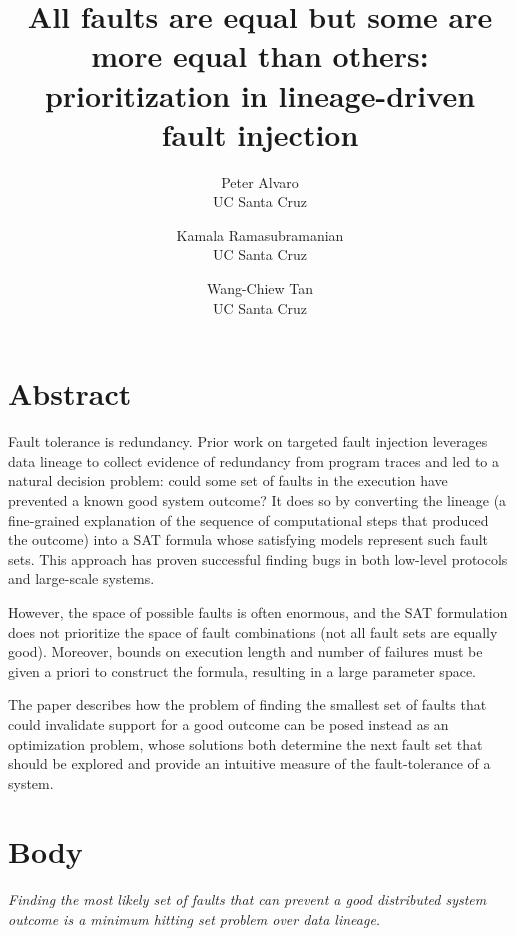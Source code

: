 \documentclass[10pt]{article}
\title{All faults are equal but some are more equal than others: prioritization in lineage-driven fault injection}
\author{Peter Alvaro\\
UC Santa Cruz\\
\and
Kamala Ramasubramanian\\
UC Santa Cruz\\
\and
Wang-Chiew Tan\\
UC Santa Cruz\\
}
\date{}
\begin{document}
\maketitle

\section{Abstract}

Fault tolerance is redundancy.  Prior work on targeted fault injection leverages data lineage to collect evidence of redundancy from program traces and led to a natural decision problem: could some set of faults in the execution have prevented a known good system outcome?   It does so by converting the lineage (a fine-grained explanation of the sequence of computational steps that produced the outcome) into a SAT formula whose satisfying models represent such fault sets.  This approach has proven successful finding bugs in both low-level protocols and large-scale systems\cite{molly}.

However, the space of possible faults is often enormous, and the SAT formulation does not prioritize the space of fault combinations (not all fault sets are equally good). Moreover, bounds on execution length and number of failures must be given a priori to construct the formula, resulting in a large parameter space.

The paper describes how the problem of finding the smallest set of faults that could invalidate support for a good outcome can be posed instead as an optimization problem, whose solutions both determine the next fault set that should be explored and provide an intuitive measure of the fault-tolerance of a system.

\section{Body}

\emph{Finding the most likely set of faults that can prevent a good distributed system outcome is a minimum hitting set problem over data lineage.}


\printbibliography
\end{document}

